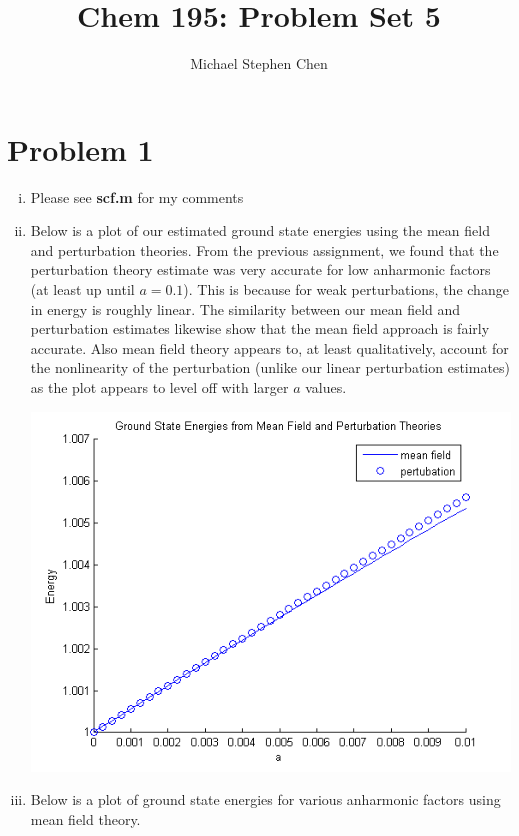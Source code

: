 \documentclass{article}
\title{Chem 195: Problem Set 5}
\author{Michael Stephen Chen}
\begin{document}
\maketitle
\pagebreak

\section*{Problem 1}
\begin{enumerate}[i)]
  \item Please see \textbf{scf.m} for my comments
  \item Below is a plot of our estimated ground state energies using the mean field and perturbation theories. From the previous assignment, we found that the perturbation theory estimate was very accurate for low anharmonic factors (at least up until $a=0.1$). This is because for weak perturbations, the change in energy is roughly linear. The similarity between our mean field and perturbation estimates likewise show that the mean field approach is fairly accurate. Also mean field theory appears to, at least qualitatively, account for the nonlinearity of the perturbation (unlike our linear perturbation estimates) as the plot appears to level off with larger $a$ values.

    \begin{center}
      \includegraphics[scale=0.5]{prob1part2}
    \end{center}

  \item Below is a plot of ground state energies for various anharmonic factors using mean field theory.


\end{enumerate}
\end{document}
